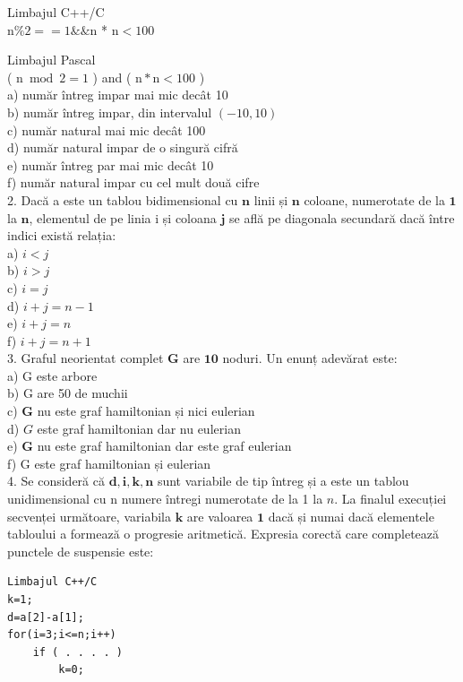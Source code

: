 \documentclass[10pt]{article}
\begin{document}
Limbajul C++/C\\
$\mathrm{n} \% 2==1 \& \& \mathrm{n}$ * $\mathrm{n}<100$

Limbajul Pascal\\
( $\mathrm{n} \bmod 2=1$ ) and ( $\mathrm{n} * \mathrm{n}<100$ )\\
a) număr întreg impar mai mic decât 10\\
b) număr întreg impar, din intervalul $(-10,10)$\\
c) număr natural mai mic decât 100\\
d) număr natural impar de o singură cifră\\
e) număr întreg par mai mic decât 10\\
f) număr natural impar cu cel mult două cifre\\
2. Dacă a este un tablou bidimensional cu $\mathbf{n}$ linii și $\mathbf{n}$ coloane, numerotate de la $\mathbf{1}$ la $\mathbf{n}$, elementul de pe linia i și coloana $\mathbf{j}$ se află pe diagonala secundară dacă între indici există relația:\\
a) $i<j$\\
b) $i>j$\\
c) $i=j$\\
d) $i+j=n-1$\\
e) $i+j=n$\\
f) $i+j=n+1$\\
3. Graful neorientat complet $\mathbf{G}$ are $\mathbf{1 0}$ noduri. Un enunț adevărat este:\\
a) G este arbore\\
b) G are 50 de muchii\\
c) $\mathbf{G}$ nu este graf hamiltonian și nici eulerian\\
d) $G$ este graf hamiltonian dar nu eulerian\\
e) $\mathbf{G}$ nu este graf hamiltonian dar este graf eulerian\\
f) G este graf hamiltonian și eulerian\\
4. Se consideră că $\mathbf{d}, \mathbf{i}, \mathbf{k}, \mathbf{n}$ sunt variabile de tip întreg și a este un tablou unidimensional cu n numere întregi numerotate de la 1 la $n$. La finalul execuției secvenței următoare, variabila $\mathbf{k}$ are valoarea $\mathbf{1}$ dacă și numai dacă elementele tabloului a formează o progresie aritmetică. Expresia corectă care completează punctele de suspensie este:

\begin{verbatim}
Limbajul C++/C
k=1;
d=a[2]-a[1];
for(i=3;i<=n;i++)
    if ( . . . . )
        k=0;
\end{verbatim}
\end{document}

